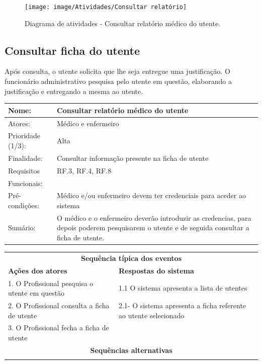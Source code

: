 \documentclass[11pt,a4paper,twoside]{report}
\begin{document}
\begin{figure}[H]
	\centering
	\texttt{[image: image/Atividades/Consultar relatório]}
	\caption{Diagrama de atividades - Consultar relatório médico do utente.}
	\label{fig:consultarrelatorio}
\end{figure}



\subsection{Consultar ficha do utente}

Após consulta, o utente solicita que lhe seja entregue uma justificação. O funcionário administrativo pesquisa pelo utente em questão, elaborando a justificação e entregando a mesma ao utente. 

\begin{center}
	\begin{tabularx}{\textwidth}{|lX|}
		\hline
		\textbf{Nome}: & \textbf{Consultar relatório médico do utente } \\ \hline
		Atores: & Médico e enfermeiro     \\ \hline
		Prioridade (1/3): & Alta  \\ \hline
		Finalidade: & Consultar informação presente na ficha de utente     \\ \hline
		Requisitos & RF.3, RF.4, RF.8   \\
		Funcionais: & \\
		Pré-condições: & Médico e/ou enfermeiro devem ter credenciais para aceder ao sistema \\
		Sumário: & O médico e o enfermeiro deverão introduzir as credencias, para depois poderem pesquisarem o utente e de seguida consultar a ficha de utente.  \\
		\hline
	\end{tabularx}
	
	\begin{tabularx}{\textwidth}{|XX|}
		\hline
		\multicolumn{2}{|c|}{\textbf{Sequência típica dos eventos} }\\
		\textbf{Ações dos atores}  & \textbf{Respostas do sistema} \\
		1.     O Profissional pesquisa o utente em questão   &   1.1 O sistema apresenta a lista de utentes   \\
		2.      O Profissional consulta a ficha de utente    & 2.1- O sistema apresenta a ficha referente ao utente selecionado     \\
		3.    O Profissional fecha a ficha de utente     &   \\
		\hline
		\multicolumn{2}{|c|}{\textbf{Sequências alternativas } }\\
		\hline
		\multicolumn{2}{|l|}{  }\\
		\hline
	\end{tabularx}
	
\end{center}
\end{document}
